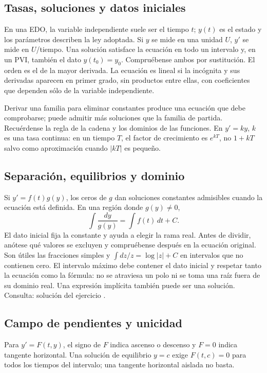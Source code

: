 %
\subsection*{Tasas, soluciones y datos iniciales}
\label{CH01-B01}
En una EDO, la variable independiente suele ser el tiempo $t$; $y(t)$ es el
estado y los parámetros describen la ley adoptada. Si $y$ se mide en una
unidad $U$, $y'$ se mide en $U$/tiempo. Una solución satisface la ecuación
en todo un intervalo y, en un PVI, también el dato $y(t_0)=y_0$.
Compruébense ambos por sustitución. El orden es el de la mayor derivada.
La ecuación es lineal si la incógnita y sus derivadas aparecen en primer
grado, sin productos entre ellas, con coeficientes que dependen sólo de la
variable independiente.

Derivar una familia para eliminar constantes produce una ecuación que
debe comprobarse; puede admitir más soluciones que la familia de partida.
Recuérdense la regla de la cadena y los dominios de las funciones.
En $y'=ky$, $k$ es una tasa continua: en un tiempo $T$, el factor de
crecimiento es $e^{kT}$, no $1+kT$ salvo como aproximación cuando $|kT|$
es pequeño.

%
\subsection*{Separación, equilibrios y dominio}
\label{CH01-B02}
Si $y'=f(t)g(y)$, los ceros de $g$ dan soluciones constantes admisibles
cuando la ecuación está definida. En una región donde $g(y)\ne0$,
\[
 \int\frac{dy}{g(y)}=\int f(t)\,dt+C.
\]
El dato inicial fija la constante y ayuda a elegir la rama real. Antes de
dividir, anótese qué valores se excluyen y compruébense después en la
ecuación original. Son útiles las fracciones simples y
$\int dz/z=\log|z|+C$ en intervalos que no contienen cero.
El intervalo máximo debe contener el dato inicial y respetar tanto la
ecuación como la fórmula: no se atraviesa un polo ni se toma una raíz fuera
de su dominio real. Una expresión implícita también puede ser una solución.
Consulta: solución del ejercicio .

%
\subsection*{Campo de pendientes y unicidad}
\label{CH01-B03}
Para $y'=F(t,y)$, el signo de $F$ indica ascenso o descenso y $F=0$
indica tangente horizontal. Una solución de equilibrio $y=c$ exige
$F(t,c)=0$ para todos los tiempos del intervalo; una tangente horizontal
aislada no basta.

